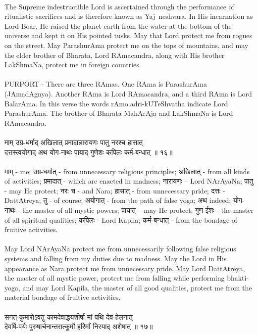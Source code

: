 \\
The Supreme indestructible Lord is ascertained through the performance of ritualistic sacrifices and is therefore known as Yaj~neshvara. In His incarnation as Lord Boar, He raised the planet earth from the water at the bottom of the universe and kept it on His pointed tusks. May that Lord protect me from rogues on the street. May ParashurAma protect me on the tops of mountains, and may the elder brother of Bharata, Lord RAmacandra, along with His brother LakShmaNa, protect me in foreign countries.\\
\\
PURPORT - There are three RAmas. One RAma is ParashurAma (JAmadAgnya). Another RAma is Lord RAmacandra, and a third RAma is Lord BalarAma. In this verse the words rAmo.adri-kUTeShvatha indicate Lord ParashurAma. The brother of Bharata MahArAja and LakShmaNa is Lord RAmacandra.\\
\\ 
माम् उग्र-धर्माद् अखिलात् प्रमादान्नारायणः पातु नरश्च हासात्\\
दत्तस्त्वयोगाद् अथ योग-नाथः पायाद् गुणेशः कपिलः कर्म-बन्धात् ॥ १६॥\\
\\
माम् - me;  उग्र-धर्मात् - from unnecessary religious principles;  अखिलात् - from all kinds of activities; प्रमादात् - which are enacted in madness;  नारायणः – Lord NArAyaNa;  पातु - may He protect;  नरः च - and Nara; हासात् - from unnecessary pride;  दत्तः - DattAtreya;  तु - of course;  अयोगात् - from the path of false yoga;  अथ  indeed;  योग-नाथः - the master of all mystic powers;  पायात् – may He protect;  गुण-ईशः - the master of all spiritual qualities;  कपिलः - Lord Kapila;  कर्म-बन्धात् - from the bondage of fruitive activities.\\
\\
May Lord NArAyaNa protect me from unnecessarily following false religious systems and falling from my duties due to madness. May the Lord in His appearance as Nara protect me from unnecessary pride. May Lord DattAtreya, the master of all mystic power, protect me from falling while performing bhakti-yoga, and may Lord Kapila, the master of all good qualities, protect me from the material bondage of fruitive activities.\\
\\
सनत्-कुमारोऽवतु कामदेवाद्धयशीर्षा मां पथि देव-हेलनात्\\
देवर्षि-वर्यः पुरुषार्चनान्तरात्कूर्मो हरिर्मां निरयाद् अशेषात् ॥ १७॥\\
\\
